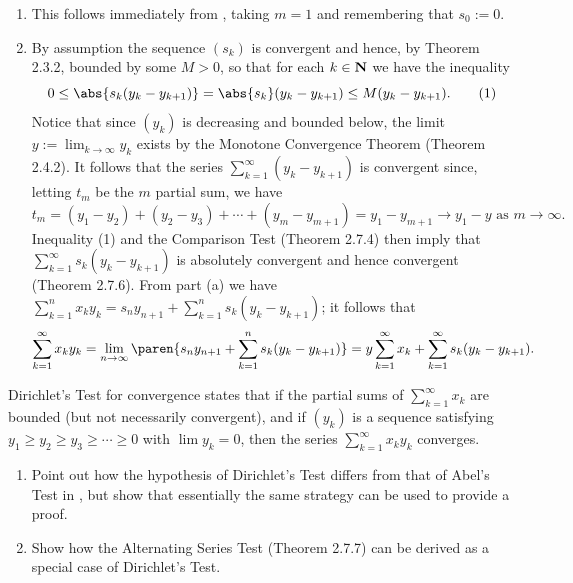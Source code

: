 \documentclass{lew98_solutions}
\begin{document}
\begin{solution}
    \begin{enumerate}
        \item This follows immediately from , taking \( m = 1 \) and remembering that \( s_0 := 0 \).

        \item By assumption the sequence \( (s_k) \) is convergent and hence, by Theorem 2.3.2, bounded by some \( M > 0 \), so that for each \( k \in \mathbf{N} \) we have the inequality
        \[
            0 \leq \abs{s_k (y_k - y_{k+1})} = \abs{s_k} (y_k - y_{k+1}) \leq M (y_k - y_{k+1}). \tag{1}
        \]
        Notice that since \( (y_k) \) is decreasing and bounded below, the limit \( y := \lim_{k \to \infty} y_k \) exists by the Monotone Convergence Theorem (Theorem 2.4.2). It follows that the series \( \sum_{k=1}^{\infty} (y_k - y_{k+1}) \) is convergent since, letting \( t_m \) be the \( m \) partial sum, we have
        \[
            t_m = (y_1 - y_2) + (y_2 - y_3) + \cdots + (y_m - y_{m+1}) = y_1 - y_{m+1} \to y_1 - y \text{ as } m \to \infty.
        \]
        Inequality (1) and the Comparison Test (Theorem 2.7.4) then imply that \( \sum_{k=1}^{\infty} s_k(y_k - y_{k+1}) \) is absolutely convergent and hence convergent (Theorem 2.7.6). From part (a) we have \( \sum_{k=1}^n x_k y_k = s_n y_{n+1} + \sum_{k=1}^n s_k (y_k - y_{k+1}) \); it follows that
        \[
            \sum_{k=1}^{\infty} x_k y_k = \lim_{n \to \infty} \paren{ s_n y_{n+1} + \sum_{k=1}^n s_k (y_k - y_{k+1}) } = y \sum_{k=1}^{\infty} x_k + \sum_{k=1}^{\infty} s_k (y_k - y_{k+1}).
        \]
    \end{enumerate}
\end{solution}

\begin{exercise}
\label{ex:2.7.14}
    Dirichlet's Test for convergence states that if the partial sums of \( \sum_{k=1}^{\infty} x_k \) are bounded (but not necessarily convergent), and if \( (y_k) \) is a sequence satisfying \( y_1 \geq y_2 \geq y_3 \geq \cdots \geq 0 \) with \( \lim y_k = 0 \), then the series \( \sum_{k=1}^{\infty} x_k y_k \) converges.
    \begin{enumerate}
        \item Point out how the hypothesis of Dirichlet's Test differs from that of Abel's Test in , but show that essentially the same strategy can be used to provide a proof.

        \item Show how the Alternating Series Test (Theorem 2.7.7) can be derived as a special case of Dirichlet's Test.
    \end{enumerate}
\end{exercise}
\end{document}

